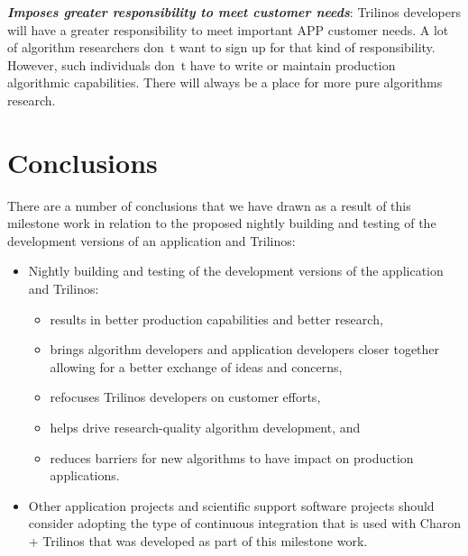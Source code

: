 \documentclass[pdf,ps2pdf,11pt]{SANDreport}
\begin{document}
{}\textit{\textbf{Imposes greater responsibility to meet customer needs}}:
Trilinos developers will have a greater responsibility to meet important APP
customer needs.  A lot of algorithm researchers don~t want to sign up for that
kind of responsibility.  However, such individuals don~t have to write or
maintain production algorithmic capabilities.  There will always be a place
for more pure algorithms research.


%
\section{Conclusions}
%

There are a number of conclusions that we have drawn as a result of this
milestone work in relation to the proposed nightly building and testing of the
development versions of an application and Trilinos:

\begin{itemize}

{}\item Nightly building and testing of the development versions of the
application and Trilinos:

  \begin{itemize}

  {}\item results in better production capabilities and better research,

  {}\item brings algorithm developers and application developers closer
  together allowing for a better exchange of ideas and concerns,

  {}\item refocuses Trilinos developers on customer efforts,

  {}\item helps drive research-quality algorithm development, and
        
  {}\item reduces barriers for new algorithms to have impact on production
  applications.

  \end{itemize}

{}\item Other application projects and scientific support software projects
should consider adopting the type of continuous integration that is used with
Charon + Trilinos that was developed as part of this milestone work.

\end{itemize}

%
\clearpage



%
%

\end{document}
